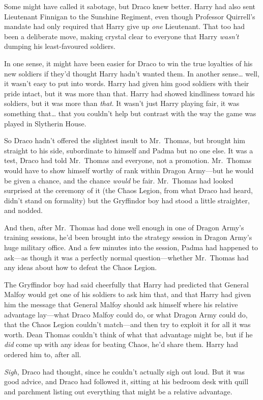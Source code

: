 Some might have called it sabotage, but Draco knew better. Harry had also sent
Lieutenant Finnigan to the Sunshine Regiment, even though Professor Quirrell's
mandate had only required that Harry give up \emph{one} Lieutenant. That too
had been a deliberate move, making crystal clear to everyone that Harry
\emph{wasn't} dumping his least-favoured soldiers.

In one sense, it might have been easier for Draco to win the true loyalties of
his new soldiers if they'd thought Harry hadn't wanted them. In another
sense{\ldots} well, it wasn't easy to put into words. Harry had given him good
soldiers with their pride intact, but it was more than that. Harry had showed
kindliness toward his soldiers, but it was more than \emph{that}. It wasn't
just Harry playing fair, it was something that{\ldots} that you couldn't help
but contrast with the way the game was played in Slytherin House.

So Draco hadn't offered the slightest insult to Mr.~Thomas, but brought him
straight to his side, subordinate to himself and Padma but no one else. It was
a test, Draco had told Mr.~Thomas and everyone, not a promotion. Mr.~Thomas
would have to show himself worthy of rank within Dragon Army---but he would be
given a chance, and the chance \emph{would} be fair. Mr.~Thomas had looked
surprised at the ceremony of it (the Chaos Legion, from what Draco had heard,
didn't stand on formality) but the Gryffindor boy had stood a little
straighter, and nodded.

And then, after Mr.~Thomas had done well enough in one of Dragon Army's
training sessions, he'd been brought into the strategy session in Dragon Army's
huge military office. And a few minutes into the session, Padma had happened to
ask---as though it was a perfectly normal question---whether Mr.~Thomas had any
ideas about how to defeat the Chaos Legion.

The Gryffindor boy had said cheerfully that Harry had predicted that General
Malfoy would get one of his soldiers to ask him that, and that Harry had given
him the message that General Malfoy should ask himself where his relative
advantage lay---what Draco Malfoy could do, or what Dragon Army could do, that
the Chaos Legion couldn't match---and then try to exploit it for all it was
worth. Dean Thomas couldn't think of what that advantage might be, but if he
\emph{did} come up with any ideas for beating Chaos, he'd share them. Harry had
ordered him to, after all.

\emph{Sigh,} Draco had thought, since he couldn't actually sigh out loud. But
it was good advice, and Draco had followed it, sitting at his bedroom desk with
quill and parchment listing out everything that might be a relative advantage.

